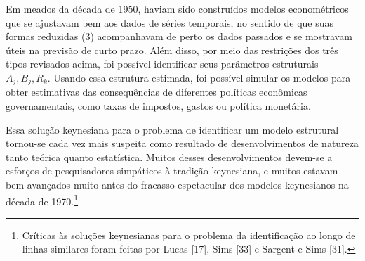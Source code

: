 \documentclass[12pt]{article}
\begin{document}
Em meados da década de 1950, haviam sido construídos modelos econométricos que se ajustavam bem aos dados de séries temporais, no sentido de que suas formas reduzidas (3) acompanhavam de perto os dados passados e se mostravam úteis na previsão de curto prazo. Além disso, por meio das restrições dos três tipos revisados acima, foi possível identificar seus parâmetros estruturais $A_j, B_j, R_k$. Usando essa estrutura estimada, foi possível simular os modelos para obter estimativas das consequências de diferentes políticas econômicas governamentais, como taxas de impostos, gastos ou política monetária.

Essa solução keynesiana para o problema de identificar um modelo estrutural tornou-se cada vez mais suspeita como resultado de desenvolvimentos de natureza tanto teórica quanto estatística. Muitos desses desenvolvimentos devem-se a esforços de pesquisadores simpáticos à tradição keynesiana, e muitos estavam bem avançados muito antes do fracasso espetacular dos modelos keynesianos na década de 1970.\footnote{Críticas às soluções keynesianas para o problema da identificação ao longo de linhas similares foram feitas por Lucas [17], Sims [33] e Sargent e Sims [31].}
\end{document}

